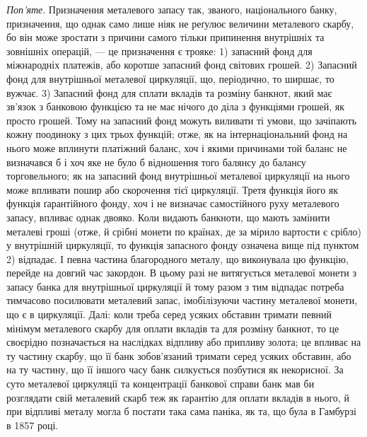 \emph{Поп’яте}. Призначення металевого запасу так, званого, національного
банку, призначення, що однак само лише ніяк не реґулює величини металевого
скарбу, бо він може зростати з причини самого тільки припинення внутрішніх
та зовнішніх операцій, — це призначення є трояке: 1) запасний фонд для міжнародніх
платежів, або коротше запасний фонд світових грошей. 2) Запасний
фонд для внутрішньої металевої циркуляції, що, періодично, то ширшає, то
вужчає. 3) Запасний фонд для сплати вкладів та розміну банкнот, який має
зв’язок з банковою функцією та не має нічого до діла з функціями грошей, як
просто грошей. Тому на запасний фонд можуть виливати ті умови, що зачіпають
кожну поодиноку з цих трьох функцій; отже, як на інтернаціональний
фонд на нього може вплинути платіжний баланс, хоч і якими причинами
той баланс не визначався б і хоч яке не було б відношення того балянсу
до балансу торговельного; як на запасний фонд внутрішньої металевої циркуляції
на нього може впливати пошир або скорочення тієї циркуляції. Третя
функція його як функція ґарантійного фонду, хоч і не визначає самостійного
руху металевого запасу, впливає однак двояко. Коли видають банкноти, що мають
замінити металеві гроші (отже, й срібні монети по країнах, де за мірило вартости
є срібло) у внутрішній циркуляції, то функція запасного фонду означена вище
під пунктом 2) відпадає. І певна частина благородного металу, що виконувала
цю функцію, перейде на довгий час закордон. В цьому разі не витягується металевої монети з запасу
банка для внутрішньої циркуляції й тому разом з тим відпадає
потреба тимчасово посилювати металевий запас, імобілізуючи частину металевої
монети, що є в циркуляції. Далі: коли треба серед усяких обставин тримати певний
мінімум металевого скарбу для оплати вкладів та для розміну банкнот, то це
своєрідно позначається на наслідках відпливу або припливу золота; це впливає
на ту частину скарбу, що її банк зобов’язаний тримати серед усяких обставин,
або на ту частину, що її іншого часу банк силкується позбутися як некорисної.
За суто металевої циркуляції та концентрації банкової справи банк мав би
розглядати свій металевий скарб теж як ґарантію для оплати вкладів в нього,
й при відпливі металу могла б постати така сама паніка, як та, що була в Гамбурзі
в 1857 році.
